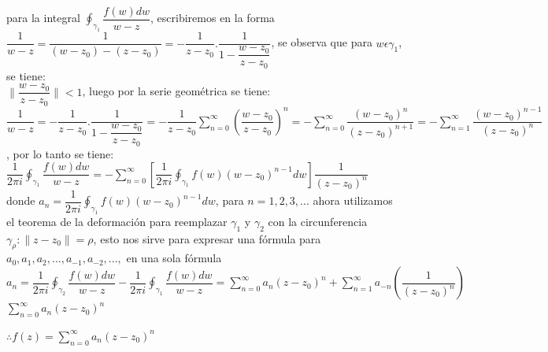 \documentclass[10pt,a4paper]{article}
\begin{document}
para la integral $\displaystyle{\oint_{\gamma_1} \dfrac{f(w) dw}{w-z}}$, escribiremos en la forma \\
$\displaystyle{\dfrac{1}{w-z} = \dfrac{1}{(w-z_0)-(z-z_0)} = - \dfrac{1}{z-z_0}.\dfrac{1}{1-\dfrac{w-z_0}{z-z_0}}}$, se observa que para $w \epsilon \gamma_1$, se tiene: \\
$\displaystyle{\parallel \dfrac{w-z_0}{z-z_0} \parallel < 1}$, luego por la serie geométrica se tiene: \\
$\displaystyle{\dfrac{1}{w-z} = - \dfrac{1}{z-z_0}.\dfrac{1}{1-\dfrac{w-z_0}{z-z_0}} = -\dfrac{1}{z-z_0} \sum_{n = 0}^{\infty} (\dfrac{w-z_0}{z-z_0})^n = - \sum_{n = 0}^{\infty} \dfrac{(w-z_0)^n}{(z-z_0)^{n+1}} = - \sum_{n = 1}^{\infty} \dfrac{(w-z_0)^{n-1}}{(z-z_0)^{n}} }$, por lo tanto se tiene:\\
$\displaystyle{\dfrac{1}{2 \pi i} \oint_{\gamma_1} \dfrac{f(w)dw}{w-z} = -\sum_{n = 0}^{\infty} [\dfrac{1}{2 \pi i} \oint_{\gamma_1} f(w)(w-z_0)^{n-1}dw] \dfrac{1}{(z-z_0)^n}}$ \\
donde $\displaystyle{a_n = \dfrac{1}{2 \pi i} \oint_{\gamma_1} f(w) (w-z_0)^{n-1}dw }$, para $n = 1,2,3,...$ ahora utilizamos el teorema de la deformación para reemplazar $\gamma_1$ y $\gamma_2$ con la circunferencia $\gamma_\rho : \parallel z - z_0 \parallel = \rho$, esto nos sirve para expresar una fórmula para $a_0,a_1,a_2,...,a_{-1},a_{-2},...,$ en una sola fórmula\\
$\displaystyle{a_n = \dfrac{1}{2 \pi i} \oint_{\gamma_2} \dfrac{f(w)dw}{w-z} - \dfrac{1}{2 \pi i} \oint_{\gamma_1} \dfrac{f(w)dw}{w-z}= \sum_{n=0}^{\infty} a_n (z-z_0)^n + \sum_{n=1}^{\infty} a_{-n} (\dfrac{1}{(z-z_0)^n})}$\\
$\displaystyle{\sum_{n=0}^{\infty} a_n (z-z_0)^n}$\begin{center}
 $\displaystyle{\therefore f(z) = \sum_{n=0}^{\infty} a_n (z-z_0)^n}$
\end{center}
\end{document}
